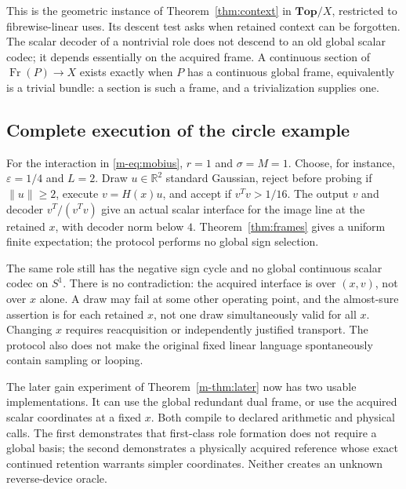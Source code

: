 \documentclass[11pt]{article}
\theoremstyle{definition}
\theoremstyle{remark}
\newcommand{\R}{\mathbb R}
\newcommand{\Fr}{\operatorname{Fr}}
\begin{document}
This is the geometric instance of Theorem~\ref{thm:context} in $\mathbf{Top}/X$, restricted to fibrewise-linear uses. Its descent test asks when retained context can be forgotten. The scalar decoder of a nontrivial role does not descend to an old global scalar codec; it depends essentially on the acquired frame. A continuous section of $\Fr(P)\to X$ exists exactly when $P$ has a continuous global frame, equivalently is a trivial bundle: a section is such a frame, and a trivialization supplies one.

\subsection{Complete execution of the circle example}
For the interaction in \eqref{m-eq:mobius}, $r=1$ and $\sigma=M=1$. Choose, for instance, $\varepsilon=1/4$ and $L=2$. Draw $u\in\R^2$ standard Gaussian, reject before probing if $\|u\|\ge2$, execute $v=H(x)u$, and accept if $v^Tv>1/16$. The output $v$ and decoder $v^T/(v^Tv)$ give an actual scalar interface for the image line at the retained $x$, with decoder norm below $4$. Theorem~\ref{thm:frames} gives a uniform finite expectation; the protocol performs no global sign selection.

The same role still has the negative sign cycle and no global continuous scalar codec on $S^1$. There is no contradiction: the acquired interface is over $(x,v)$, not over $x$ alone. A draw may fail at some other operating point, and the almost-sure assertion is for each retained $x$, not one draw simultaneously valid for all $x$. Changing $x$ requires reacquisition or independently justified transport. The protocol also does not make the original fixed linear language spontaneously contain sampling or looping.

The later gain experiment of Theorem~\ref{m-thm:later} now has two usable implementations. It can use the global redundant dual frame, or use the acquired scalar coordinates at a fixed $x$. Both compile to declared arithmetic and physical calls. The first demonstrates that first-class role formation does not require a global basis; the second demonstrates a physically acquired reference whose exact continued retention warrants simpler coordinates. Neither creates an unknown reverse-device oracle.
\end{document}
